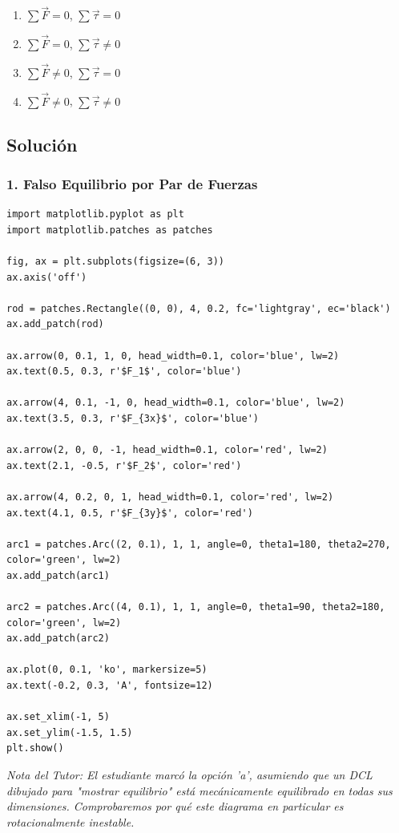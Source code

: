 \documentclass[12pt, a4paper]{article}
\begin{document}
\begin{enumerate}[label=\alph*)]
    \item $\sum \vec{F} = 0$, $\sum \vec{\tau} = 0$
    \item $\sum \vec{F} = 0$, $\sum \vec{\tau} \neq 0$
    \item $\sum \vec{F} \neq 0$, $\sum \vec{\tau} = 0$
    \item $\sum \vec{F} \neq 0$, $\sum \vec{\tau} \neq 0$
\end{enumerate}

\subsection*{Solución}

\subsubsection*{1. Falso Equilibrio por Par de Fuerzas}

\begin{verbatim}
import matplotlib.pyplot as plt
import matplotlib.patches as patches

fig, ax = plt.subplots(figsize=(6, 3))
ax.axis('off')

rod = patches.Rectangle((0, 0), 4, 0.2, fc='lightgray', ec='black')
ax.add_patch(rod)

ax.arrow(0, 0.1, 1, 0, head_width=0.1, color='blue', lw=2)
ax.text(0.5, 0.3, r'$F_1$', color='blue')

ax.arrow(4, 0.1, -1, 0, head_width=0.1, color='blue', lw=2)
ax.text(3.5, 0.3, r'$F_{3x}$', color='blue')

ax.arrow(2, 0, 0, -1, head_width=0.1, color='red', lw=2)
ax.text(2.1, -0.5, r'$F_2$', color='red')

ax.arrow(4, 0.2, 0, 1, head_width=0.1, color='red', lw=2)
ax.text(4.1, 0.5, r'$F_{3y}$', color='red')

arc1 = patches.Arc((2, 0.1), 1, 1, angle=0, theta1=180, theta2=270, color='green', lw=2)
ax.add_patch(arc1)

arc2 = patches.Arc((4, 0.1), 1, 1, angle=0, theta1=90, theta2=180, color='green', lw=2)
ax.add_patch(arc2)

ax.plot(0, 0.1, 'ko', markersize=5)
ax.text(-0.2, 0.3, 'A', fontsize=12)

ax.set_xlim(-1, 5)
ax.set_ylim(-1.5, 1.5)
plt.show()
\end{verbatim}

\textit{Nota del Tutor: El estudiante marcó la opción 'a', asumiendo que un DCL dibujado para "mostrar equilibrio" está mecánicamente equilibrado en todas sus dimensiones. Comprobaremos por qué este diagrama en particular es rotacionalmente inestable.}
\end{document}
